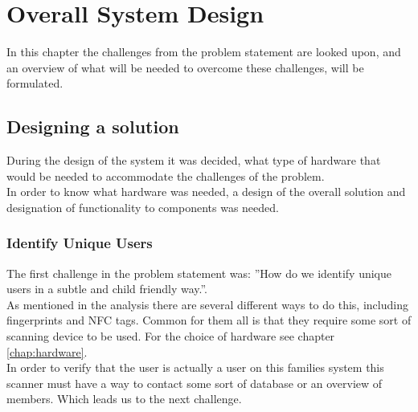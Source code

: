\chapter{Overall System Design}
In this chapter the challenges from the problem statement are looked upon, and an overview of what will be needed to overcome these challenges, will be formulated.


\section{Designing a solution}
During the design of the system it was decided, what type of hardware that would be needed to accommodate the challenges of the problem.\\
In order to know what hardware was needed, a design of the overall solution and designation of functionality to components was needed.\\

\subsection{Identify Unique Users}
The first challenge in the problem statement was: ''How do we identify unique users in a subtle and child friendly way.''.\\
As mentioned in the analysis there are several different ways to do this, including fingerprints and NFC tags. Common for them all is that they require some sort of scanning device to be used. For the choice of hardware see chapter \ref{chap:hardware}.\\
In order to verify that the user is actually a user on this families system this scanner must have a way to contact some sort of database or an overview of members. Which leads us to the next challenge.

